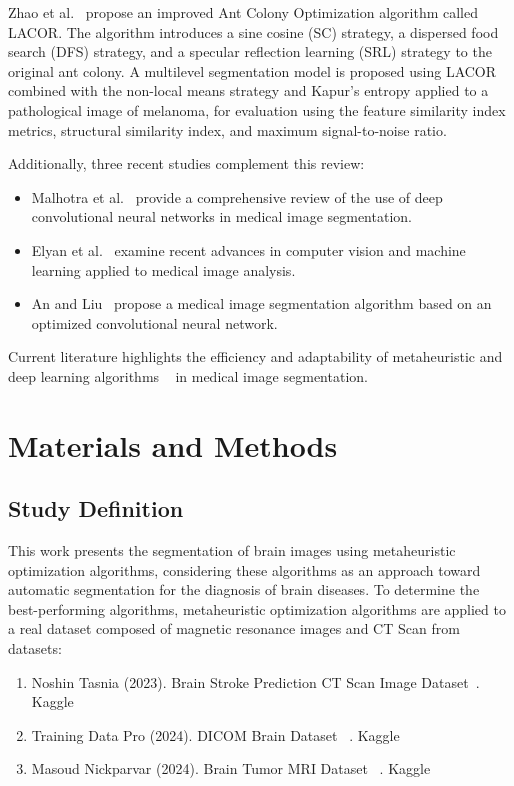 \documentclass{elsarticle}
\begin{document}
\noindent Zhao et al.~\cite{Zhao2023} propose an improved Ant Colony Optimization algorithm called LACOR. The algorithm introduces a sine cosine (SC) strategy, a dispersed food search (DFS) strategy, and a specular reflection learning (SRL) strategy to the original ant colony. A multilevel segmentation model is proposed using LACOR combined with the non-local means strategy and Kapur's entropy applied to a pathological image of melanoma, for evaluation using the feature similarity index metrics, structural similarity index, and maximum signal-to-noise ratio.

\noindent Additionally, three recent studies complement this review:

\begin{itemize}
    \item Malhotra et al.~\cite{Chakraborty2022} provide a comprehensive review of the use of deep convolutional neural networks in medical image segmentation.
    \item Elyan et al.~\cite{Elyan2022} examine recent advances in computer vision and machine learning applied to medical image analysis.
    \item An and Liu~\cite{An2020} propose a medical image segmentation algorithm based on an optimized convolutional neural network.
\end{itemize}

\noindent Current literature highlights the efficiency and adaptability of metaheuristic and deep learning algorithms ~\cite{jones2023automated} in medical image segmentation.


\section{Materials and Methods}
\subsection{Study Definition}
\noindent This work presents the segmentation of brain images using metaheuristic optimization algorithms, considering these algorithms as an approach toward automatic segmentation for the diagnosis of brain diseases. To determine the best-performing algorithms, metaheuristic optimization algorithms are applied to a real dataset composed of magnetic resonance images and CT Scan from datasets:
\begin{enumerate}
    \item Noshin Tasnia (2023). Brain Stroke Prediction CT Scan Image Dataset~\cite{Tasnia2023}. Kaggle
    \item Training Data Pro (2024). DICOM Brain Dataset ~\cite{TrainingDataPro2024}. Kaggle
    \item Masoud Nickparvar (2024). Brain Tumor MRI Dataset ~\cite{Nickparvar2024}. Kaggle

\end{enumerate}
\end{document}
